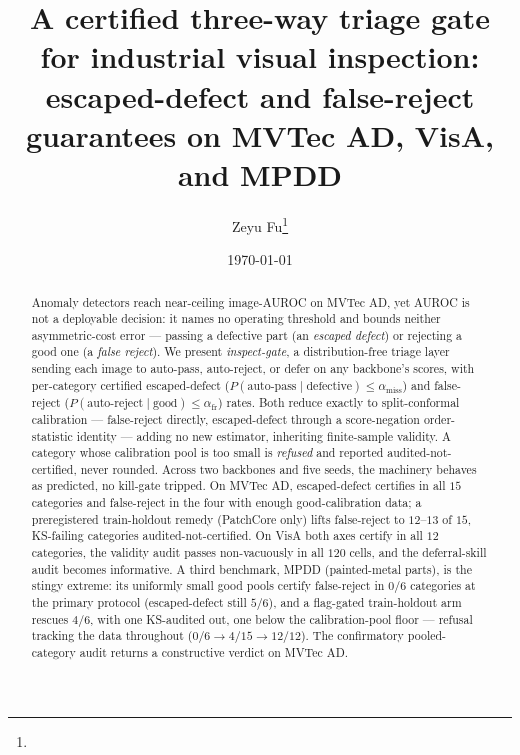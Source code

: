\documentclass[11pt]{article}
\title{A certified three-way triage gate for industrial visual inspection:
escaped-defect and false-reject guarantees on MVTec AD, VisA, and MPDD}
\author{Zeyu Fu\thanks{\userfill{full author list, affiliations, ORCID iD(s),
and corresponding-author email/postal address.}}}
\date{\today}
\begin{document}
\maketitle

\begin{abstract}
\noindent Anomaly detectors reach near-ceiling image-AUROC on MVTec AD, yet AUROC is not a
deployable decision: it names no operating threshold and bounds neither asymmetric-cost error ---
passing a defective part (an \emph{escaped defect}) or rejecting a good one (a \emph{false reject}).
We present \emph{inspect-gate}, a distribution-free triage layer sending each image to auto-pass,
auto-reject, or defer on any backbone's scores, with per-category certified escaped-defect
($P(\text{auto-pass}\mid\text{defective}) \le \alpha_{\text{miss}}$) and false-reject
($P(\text{auto-reject}\mid\text{good}) \le \alpha_{\text{fr}}$) rates. Both reduce exactly to
split-conformal calibration --- false-reject directly, escaped-defect through a score-negation
order-statistic identity --- adding no new estimator, inheriting finite-sample validity. A
category whose calibration pool is too small is \emph{refused} and reported
audited-not-certified, never rounded. Across two backbones and five
seeds, the machinery behaves as predicted, no kill-gate tripped. On MVTec AD,
escaped-defect certifies in all $15$ categories and false-reject in the four with enough
good-calibration data; a preregistered train-holdout remedy (PatchCore only) lifts false-reject to
$12$--$13$ of $15$, KS-failing categories audited-not-certified. On VisA both axes certify in all
$12$ categories, the validity audit passes non-vacuously in all
$120$ cells, and the deferral-skill audit becomes informative. A third benchmark, MPDD
(painted-metal parts), is the stingy extreme: its uniformly small good pools certify false-reject
in $0/6$ categories at the primary protocol (escaped-defect still $5/6$), and a flag-gated
train-holdout arm rescues $4/6$, with one KS-audited out, one below the calibration-pool
floor --- refusal tracking the data throughout ($0/6 \to 4/15 \to 12/12$). The confirmatory pooled-category
audit returns a constructive verdict on MVTec AD.
\end{abstract}
\end{document}
